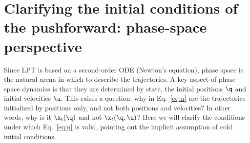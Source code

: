 \section{Clarifying the initial conditions of the pushforward:
phase-space perspective}\label{sec:phase-space}
\noindent Since LPT is based on a
second-order ODE (Newton's equation),
phase space is the natural arena in which to describe the trajectories.
A key aspect of phase-space dynamics is that they are
determined by state, the initial positions $\q$ and initial velocities $\u$.
This raises a question: why in Eq.~\eqref{eq:n} are the
trajectories initialized 
by positions only, and not both positions {and} velocities?
In other words, why is it $\x_t(\q)$ and not $\x_t(\q,\u)$?
Here we will clarify the conditions under which
Eq.~\eqref{eq:n} is valid, pointing out the implicit assumption
of cold initial conditions.


